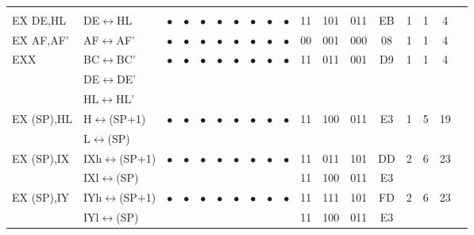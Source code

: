 \documentclass[oneside,a4paper]{book}
\begin{document}
{\tt \scriptsize \setlength{\fboxsep}{0.25mm}
	\setlength{\tabcolsep}{1mm}
	\begin{tabular}{llcccccccccccccccl}
		     
		\instrheader

		& & & & & & & & & & & & & & & & & \\

		EX DE,HL\instrt & 
			DE$\leftrightarrow$HL & 
			$\bullet$ & 
				$\bullet$ & 
				$\bullet$ & 
				$\bullet$ & 
				$\bullet$ & 
				$\bullet$ & 
				$\bullet$ & 
				$\bullet$ & 
			11 & 101 & 011 & 
			EB & 1 & 
			1 & 4 & \instrb \\

		EX AF,AF'\instrt & 
			AF$\leftrightarrow$AF' & 
			$\bullet$ & 
				$\bullet$ & 
				$\bullet$ & 
				$\bullet$ & 
				$\bullet$ & 
				$\bullet$ & 
				$\bullet$ & 
				$\bullet$ & 	
			00 & 001 & 000
			& 08 & 1 & 1 & 4 & \instrb \\

		EXX\instrt & 
			BC$\leftrightarrow$BC' & 
			$\bullet$ & 
				$\bullet$ & 
				$\bullet$ & 
				$\bullet$ & 
				$\bullet$ & 
				$\bullet$ & 
				$\bullet$ & 
				$\bullet$ & 
			11 & 011 & 001 & 
			D9 & 1 & 1 & 4 & \\ 
		& DE$\leftrightarrow$DE' & \\ 
		& HL$\leftrightarrow$HL' & \instrb \\

		EX (SP),HL\instrt & 
			H$\leftrightarrow$(SP+1) & 
			$\bullet$ & 
				$\bullet$ & 
				$\bullet$ & 
				$\bullet$ & 
				$\bullet$ & 
				$\bullet$ & 
				$\bullet$ & 
				$\bullet$ & 
			11 & 100 & 011 & 
			E3 & 1 & 
			5 & 19 & \\ 
		& L$\leftrightarrow$(SP) & \instrb \\

		EX (SP),IX\instrt & 
			IXh$\leftrightarrow$(SP+1) & 
			$\bullet$ & 
				$\bullet$ & 
				$\bullet$ & 
				$\bullet$ & 
				$\bullet$ & 
				$\bullet$ & 
				$\bullet$ & 
				$\bullet$ & 
			11 & 011 & 101 & 
			DD & 2 & 
			6 & 23 & \\ 
		& IXl$\leftrightarrow$(SP) & \multicolumn{8}{c}{} & 11 & 100 & 011 & E3 & & \instrb \\

		EX (SP),IY\instrt & 
			IYh$\leftrightarrow$(SP+1) & 
			$\bullet$ & 
				$\bullet$ & 
				$\bullet$ & 
				$\bullet$ & 
				$\bullet$ & 
				$\bullet$ & 
				$\bullet$ & 
				$\bullet$ & 
			11 & 111 & 101 & 
			FD & 2 & 
			6 & 23 & \\
		& IYl$\leftrightarrow$(SP) & \multicolumn{8}{c}{} & 11 & 100 & 011 & E3 & & \instrb \\


\end{tabular}}
\end{document}
